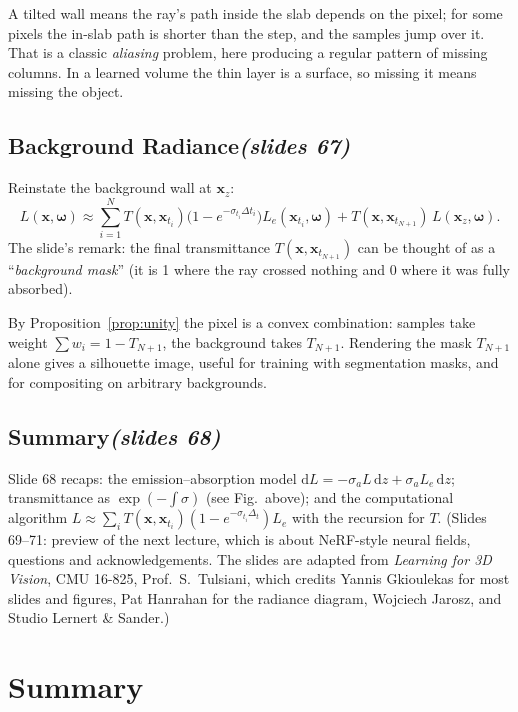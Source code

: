 \documentclass[11pt,a4paper]{article}
\newcommand{\slides}[1]{\texorpdfstring{\hfill{\normalfont\small\emph{(slides #1)}}}{ (slides #1)}}
\newcommand{\x}{\bm{x}}
\newcommand{\w}{\bm{\omega}}
\theoremstyle{remark}\newtheorem*{remark}{Remark}
\begin{document}
\begin{intuition}
A tilted wall means the ray's path inside the slab depends on the pixel; for some pixels the in-slab path is shorter than the step, and the samples jump over it. That is a classic \emph{aliasing} problem, here producing a regular pattern of missing columns. In a learned volume the thin layer is a surface, so missing it means missing the object.
\end{intuition}

\subsection{Background Radiance\slides{67}}

Reinstate the background wall at $\x_z$:
\[
L(\x,\w)\approx\sum_{i=1}^NT(\x,\x_{t_i})\bigl(1-e^{-\sigma_{t_i}\Delta t_i}\bigr)L_e(\x_{t_i},\w)+T(\x,\x_{t_{N+1}})\,L(\x_z,\w).
\]
The slide's remark: the final transmittance $T(\x,\x_{t_{N+1}})$ can be thought of as a ``\emph{background mask}'' (it is 1 where the ray crossed nothing and 0 where it was fully absorbed).

\begin{intuition}
By Proposition~\ref{prop:unity} the pixel is a convex combination: samples take weight $\sum w_i=1-T_{N+1}$, the background takes $T_{N+1}$. Rendering the mask $T_{N+1}$ alone gives a silhouette image, useful for training with segmentation masks, and for compositing on arbitrary backgrounds.
\end{intuition}

\subsection{Summary\slides{68}}

Slide 68 recaps: the emission--absorption model $\mathrm dL=-\sigma_aL\,\mathrm dz+\sigma_aL_e\,\mathrm dz$; transmittance as $\exp(-\int\sigma)$ (see Fig.\ above); and the computational algorithm $L\approx\sum_iT(\x,\x_{t_i})(1-e^{-\sigma_{t_i}\Delta_t})L_e$ with the recursion for $T$. (Slides 69--71: preview of the next lecture, which is about NeRF-style neural fields, questions and acknowledgements. The slides are adapted from \emph{Learning for 3D Vision}, CMU 16-825, Prof.\ S.~Tulsiani, which credits Yannis Gkioulekas for most slides and figures, Pat Hanrahan for the radiance diagram, Wojciech Jarosz, and Studio Lernert \& Sander.)

\section{Summary}
\end{document}
